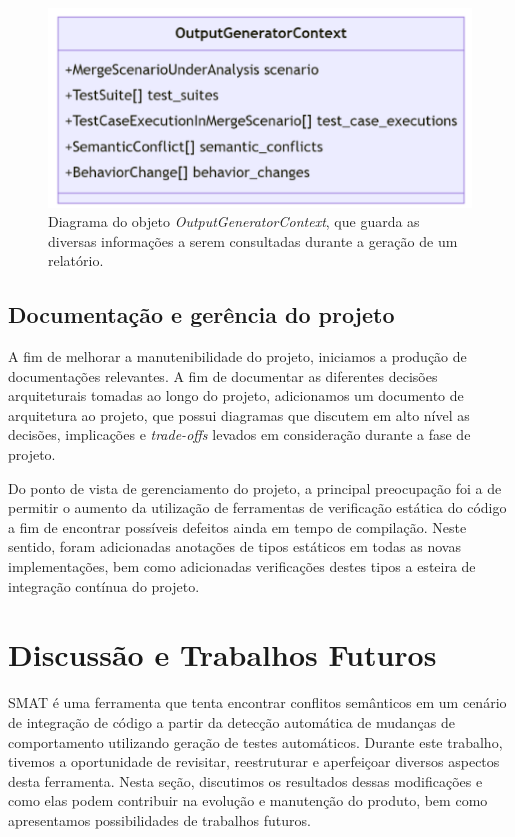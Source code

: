 \documentclass[12pt]{article}
\begin{document}
\begin{figure}[H]
    \centering
    \includegraphics{imagens/ogc.png}
    \caption{Diagrama do objeto \textit{OutputGeneratorContext}, que guarda as diversas informações a serem consultadas durante a geração de um relatório.}
    \label{fig:ogc}
\end{figure}

\subsection{Documentação e gerência do projeto}
A fim de melhorar a manutenibilidade do projeto, iniciamos a produção de documentações relevantes. A fim de documentar as diferentes decisões arquiteturais tomadas ao longo do projeto, adicionamos um documento de arquitetura ao projeto, que possui diagramas que discutem em alto nível as decisões, implicações e \textit{trade-offs} levados em consideração durante a fase de projeto.

Do ponto de vista de gerenciamento do projeto, a principal preocupação foi a de permitir o aumento da utilização de ferramentas de verificação estática do código a fim de encontrar possíveis defeitos ainda em tempo de compilação. Neste sentido, foram adicionadas anotações de tipos estáticos em todas as novas implementações, bem como adicionadas verificações destes tipos a esteira de integração contínua do projeto.

\section{Discussão e Trabalhos Futuros}
SMAT é uma ferramenta que tenta encontrar conflitos semânticos em um cenário de integração de código a partir da detecção automática de mudanças de comportamento utilizando geração de testes automáticos. Durante este trabalho, tivemos a oportunidade de revisitar, reestruturar e aperfeiçoar diversos aspectos desta ferramenta. Nesta seção, discutimos os resultados dessas modificações e como elas podem contribuir na evolução e manutenção do produto, bem como apresentamos possibilidades de trabalhos futuros.
\end{document}

